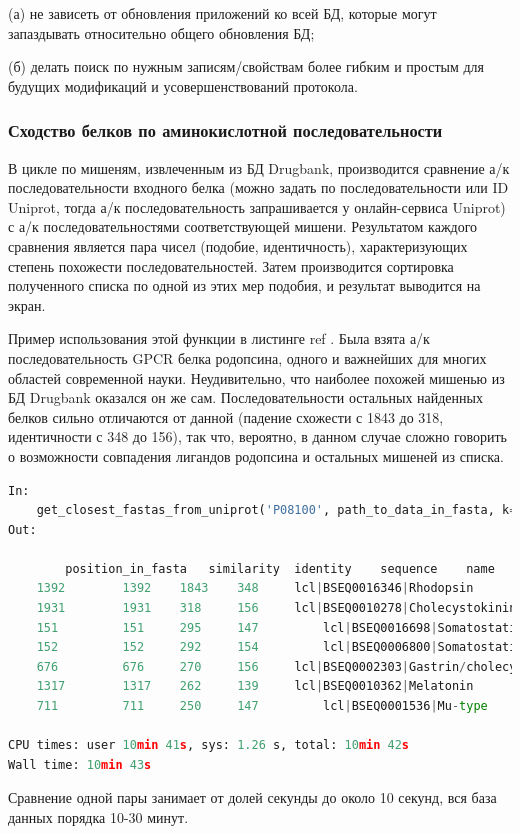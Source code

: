 \documentclass[a4paper,14pt]{article}         %
\begin{document}
(а) не зависеть от обновления приложений ко всей БД, которые могут запаздывать относительно общего обновления БД; 

(б) делать поиск по нужным записям/свойствам более гибким и простым для будущих модификаций и усовершенствований протокола.

\subsubsection{Сходство белков по аминокислотной последовательности}

В цикле по мишеням, извлеченным из БД Drugbank, производится сравнение а/к последовательности входного белка (можно задать по последовательности или ID Uniprot, тогда а/к последовательность запрашивается у онлайн-сервиса Uniprot) с а/к последовательностями соответствующей мишени. Результатом каждого сравнения является пара чисел (подобие, идентичность), характеризующих степень похожести последовательностей. Затем производится сортировка полученного списка по одной из этих мер подобия, и результат выводится на экран.

Пример использования этой функции в листинге \color{orange} ref
\color{black}. Была взята а/к последовательность GPCR белка родопсина, одного и важнейших для многих областей современной науки. Неудивительно, что наиболее похожей мишенью из БД Drugbank оказался он же сам. Последовательности остальных найденных белков сильно отличаются от данной (падение схожести с 1843 до 318, идентичности с 348 до 156), так что, вероятно, в данном случае сложно говорить о возможности совпадения лигандов родопсина и остальных мишеней из списка.
\begin{lstlisting}[language=Python, caption=Сходство мишеней по а/к последовательности с помощью Biopython с входными данными -- ID Uniptor белка Родопсина из семейства GPCR.]
In:
	get_closest_fastas_from_uniprot('P08100', path_to_data_in_fasta, k=0, align_matrix='blosum62', sim_or_ident=True)
Out:

	 	position_in_fasta 	similarity 	identity 	sequence 	name
	1392 	 	1392 	1843 	348  	lcl|BSEQ0016346|Rhodopsin
	1931 	 	1931 	318 	156 	lcl|BSEQ0010278|Cholecystokinin
	151 	 	151 	295 	147 		lcl|BSEQ0016698|Somatostatin
	152 	 	152 	292 	154 		lcl|BSEQ0006800|Somatostatin
	676 	 	676 	270 	156 	lcl|BSEQ0002303|Gastrin/cholecystokinin
	1317 	 	1317 	262 	139 	lcl|BSEQ0010362|Melatonin
	711 	 	711 	250 	147 		lcl|BSEQ0001536|Mu-type

CPU times: user 10min 41s, sys: 1.26 s, total: 10min 42s
Wall time: 10min 43s
\end{lstlisting}
Сравнение одной пары занимает от долей секунды до около 10 секунд, вся база данных порядка 10-30 минут.
\end{document}
